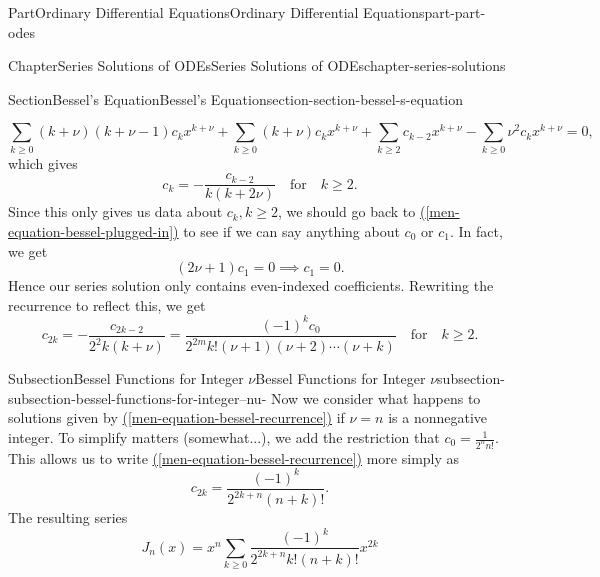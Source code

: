 \documentclass[twoside,10pt,]{book}
\newcommand{\xreffont}{\relax}
\numberwithin{equation}{part}
\newcommand{\qq}[1]{\quad\text{#1}\quad}
\begin{document}
\begin{partptx}{Part}{Ordinary Differential Equations}{}{Ordinary Differential Equations}{}{}{part-part-odes}
\begin{chapterptx}{Chapter}{Series Solutions of ODEs}{}{Series Solutions of ODEs}{}{}{chapter-series-solutions}
\begin{sectionptx}{Section}{Bessel's Equation}{}{Bessel's Equation}{}{}{section-section-bessel-s-equation}
\begin{introduction}{}
\begin{equation}
\sum_{k\geq0}(k+\nu)(k+\nu-1)c_{k}x^{k + \nu} + \sum_{k\geq0}(k+\nu)c_{k}x^{k + \nu} + \sum_{k\geq2}c_{k-2}x^{k + \nu} - \sum_{k\geq0}\nu^{2}c_{k}x^{k + \nu} = 0\text{,}\label{men-equation-bessel-plugged-in}
\end{equation}
which gives%
\begin{equation*}
c_{k} = -\frac{c_{k-2}}{k(k+2\nu)}\qq{for}k\geq2\text{.}
\end{equation*}
Since this only gives us data about \(c_{k}, k\geq 2\), we should go back to \hyperref[men-equation-bessel-plugged-in]{({\xreffont\ref{men-equation-bessel-plugged-in}})} to see if we can say anything about \(c_{0}\) or \(c_{1}\). In fact, we get%
\begin{equation*}
(2\nu + 1)c_{1} = 0 \implies c_{1} = 0\text{.}
\end{equation*}
Hence our series solution only contains even-indexed coefficients. Rewriting the recurrence to reflect this, we get%
\begin{equation}
c_{2k} = -\frac{c_{2k - 2}}{2^{2}k(k + \nu)} = \frac{(-1)^{k}c_{0}}{2^{2m}k!(\nu + 1)(\nu + 2)\cdots(\nu + k)}\qq{for} k\geq2.\label{men-equation-bessel-recurrence}
\end{equation}
%
\end{introduction}%
%
%
\typeout{************************************************}
\typeout{************************************************}
%
\begin{subsectionptx}{Subsection}{Bessel Functions for Integer \(\nu\)}{}{Bessel Functions for Integer \(\nu\)}{}{}{subsection-subsection-bessel-functions-for-integer--nu-}
Now we consider what happens to solutions given by \hyperref[men-equation-bessel-recurrence]{({\xreffont\ref{men-equation-bessel-recurrence}})} if \(\nu = n\) is a nonnegative integer. To simplify matters (somewhat...), we add the restriction that \(c_{0} = \frac{1}{2^{n}n!}\). This allows us to write \hyperref[men-equation-bessel-recurrence]{({\xreffont\ref{men-equation-bessel-recurrence}})} more simply as%
\begin{equation}
c_{2k} = \frac{(-1)^{k}}{2^{2k + n}(n + k)!}.\label{men-equation-bessel-function-nu-integer}
\end{equation}
The resulting series%
\begin{equation}
J_{n}(x) = x^{n}\sum_{k\geq0}\frac{(-1)^{k}}{2^{2k + n}k!(n + k)!}x^{2k}\label{men-equation-bessel-function-first-kind}
\end{equation}

\end{subsectionptx}
\end{sectionptx}
\end{chapterptx}
\end{partptx}
\end{document}

